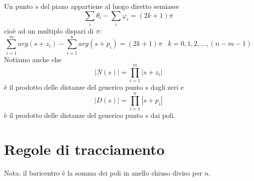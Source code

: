 \documentclass[a4paper]{report}
\begin{document}
Un punto $s$ del piano appartiene al luogo diretto semiasse
\[
\sum_i \theta_i - \sum_i \varphi_i = (2k + 1) \pi
\]
cio\`e ad un multiplo dispari di $\pi$:
\[
\sum_{i = 1}^{m} arg (s + z_i) - \sum_{i = 1}^{n} arg (s + p_i) = (2k
+ 1) \pi \;\;\; k = 0,1,2,...,(n - m -1)
\]
Notiamo anche che
\[
|N(s)| = \prod\limits_{i = 1}^{m} |s + z_i|
\]
\`e il prodotto delle distanze del generico punto $s$ dagli zeri e
\[
|D(s)| = \prod\limits_{i = 1}^{n} |s + p_i|
\]
\`e il prodotto delle distanze del generico punto $s$ dai poli.

\section{Regole di tracciamento}
Nota: il baricentro \`e la somma dei poli in anello
chiuso diviso per $n$.
\end{document}
